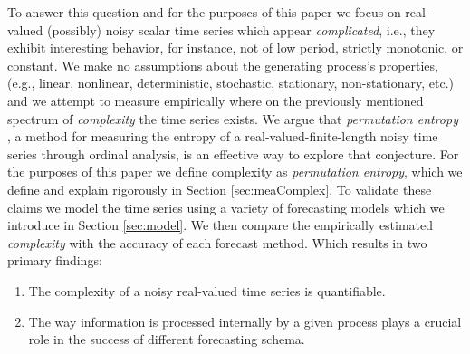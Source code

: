 To answer this question and for the purposes of this paper we focus on real-valued (possibly) noisy scalar time series which appear \emph{complicated}, i.e., they exhibit interesting behavior, for instance, not of low period, strictly monotonic, or constant. We make no assumptions about the generating process's properties,(e.g., linear, nonlinear, deterministic, stochastic, stationary, non-stationary, etc.) and we attempt to measure empirically where on the previously mentioned spectrum of \emph{complexity} the time series exists.
We argue that \emph{permutation entropy}
\cite{bandt2002per}, a method for measuring the entropy of a
real-valued-finite-length noisy time series through ordinal analysis, is an effective way to explore that conjecture. For the purposes of this paper we define complexity as \emph{permutation entropy}, which we define and explain rigorously in Section \ref{sec:meaComplex}.  To validate these claims we model the time series using a variety of forecasting models which we introduce in Section \ref{sec:model}. We then compare the empirically estimated \emph{complexity} with the accuracy of each forecast method. Which results in two primary findings:


\begin{enumerate}

\item The complexity of a noisy real-valued time series is quantifiable.

\item The way information is processed internally by a given process plays a crucial role in the success of different forecasting schema.

\end{enumerate}






